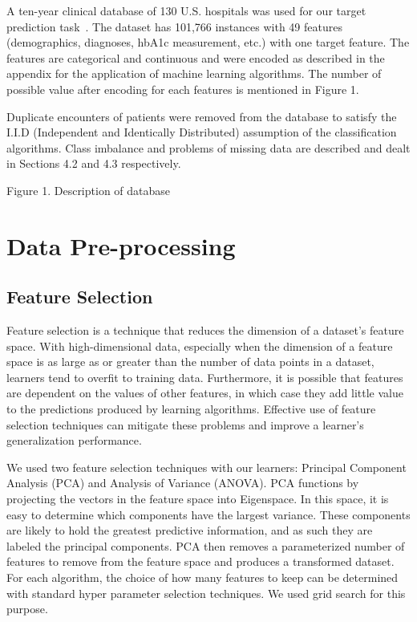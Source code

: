 \documentclass[conference]{IEEEtran}
\begin{document}
A ten-year clinical database of 130 U.S. hospitals was used for our target prediction task~\cite{dataset-2014, hba1c-2014}. The dataset has 101,766 instances with 49 features (demographics, diagnoses, hbA1c measurement, etc.) with one target feature. The features are categorical and continuous and were encoded as described in the appendix for the application of machine learning algorithms. The number of possible value after encoding for each features is mentioned in Figure 1.

Duplicate encounters of patients were removed from the database to satisfy the I.I.D (Independent and Identically Distributed) assumption of the classification algorithms. Class imbalance and problems of missing data are described and dealt in Sections 4.2 and 4.3 respectively.

Figure 1. Description of database

\section{Data Pre-processing}


\subsection{Feature Selection}
Feature selection is a technique that reduces the dimension of a dataset's feature space. With high-dimensional data, especially when the dimension of a feature space is as large as or greater than the number of data points in a dataset, learners tend to overfit to training data. Furthermore, it is possible that features are dependent on the values of other features, in which case they add little value to the predictions produced by learning algorithms. Effective use of feature selection techniques can mitigate these problems and improve a learner's generalization performance. 

We used two feature selection techniques with our learners: Principal Component Analysis (PCA) and Analysis of Variance (ANOVA). PCA functions by projecting the vectors in the feature space into Eigenspace. In this space, it is easy to determine which components have the largest variance. These components are likely to hold the greatest predictive information, and as such they are labeled the principal components. PCA then removes a parameterized number of features to remove from the feature space and produces a transformed dataset.%
For each algorithm, the choice of how many features to keep can be determined with standard hyper parameter selection techniques. We used grid search for this purpose.
\end{document}
